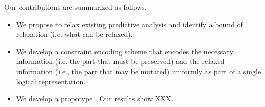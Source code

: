 Our contributions are summarized as follows.
\begin{itemize}
\item We propose to relax existing predictive analysis and identify a bound of relaxation (i.e. what can
be relaxed).
\item We develop a constraint encoding scheme that encodes the necessary information (i.e. the
part that must be preserved) and the relaxed information (i.e., the part that may be mutated) uniformly as part of a single logical representation.
\item We develop a propotype \sysname. Our results show XXX.
\end{itemize}








